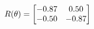 \documentclass[preview]{standalone}
\begin{document}
\begin{align*}
\special{dvisvgm:raw <g id='unique000'>}R(\theta) = \begin{bmatrix}-0.87 & 0.50\\-0.50 & -0.87\end{bmatrix}\special{dvisvgm:raw </g>}
\end{align*}
\end{document}
